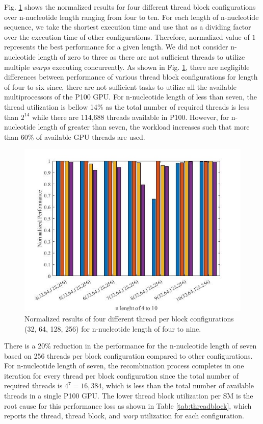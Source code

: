 Fig. \ref{fig:NormalizedPerf} shows the normalized results for  four different thread block configurations over n-nucleotide length ranging from four to ten. For each length of n-nucleotide sequence, we take the shortest execution time and use that as a dividing factor over the execution time of other configurations. Therefore, normalized value of $1$ represents the best performance for a given length. We did not consider n-nucleotide length of zero to three as there are not sufficient threads to utilize multiple \emph{warps} executing concurrently. As shown in Fig. \ref{fig:NormalizedPerf}, there are negligible differences between performance of various thread block configurations for length of four to six since, there are not sufficient tasks to utilize all the available multiprocessors of the P100 GPU. For n-nucleotide length of less than seven, the thread utilization is bellow 14\% as the total number of required threads is less than $2^{14}$ while there are 114,688 threads available in P100. However, for n-nucleotide length of greater than seven, the workload increases such that more than 60\% of available GPU threads are used.
\begin{figure}[t!]
\begin{center}
\includegraphics[clip,width=1\columnwidth]{Figure/Norm_Perf.jpg}

\caption{Normalized results of four different thread per block configurations (32, 64, 128, 256) for n-nucleotide length of four to nine. }
\label{fig:NormalizedPerf}
\end{center}
\end{figure}
There is a 20\% reduction in the performance for the n-nucleotide length of seven based on 256 threads per block configuration compared to other configurations. For n-nucleotide length of seven, the recombination process completes in one iteration for every thread per block configuration since the total number of required threads is $4^7= 16,384$, which is less than the total number of available threads in a single P100 GPU. The lower thread block utilization per SM is the root cause for this performance loss as shown in Table \ref{tab:threadblock}, which reports the thread, thread block, and \emph{warp} utilization for each configuration. 
